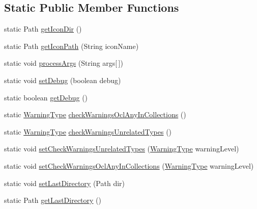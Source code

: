\subsection*{Static Public Member Functions}
\begin{DoxyCompactItemize}
\item 
static Path \hyperlink{classorg_1_1tzi_1_1use_1_1config_1_1_options_a686a663733d70cefe740299fad575731}{get\-Icon\-Dir} ()
\item 
static Path \hyperlink{classorg_1_1tzi_1_1use_1_1config_1_1_options_abd21f5e301e3168c381cd66e553f20c8}{get\-Icon\-Path} (String icon\-Name)
\item 
static void \hyperlink{classorg_1_1tzi_1_1use_1_1config_1_1_options_ab6bcad2f7ded933e8375c17c1926250f}{process\-Args} (String args\mbox{[}$\,$\mbox{]})
\item 
static void \hyperlink{classorg_1_1tzi_1_1use_1_1config_1_1_options_abdffb8b892ceaf0ad3cbe933b1216a78}{set\-Debug} (boolean debug)
\item 
static boolean \hyperlink{classorg_1_1tzi_1_1use_1_1config_1_1_options_af44b3d0bc782b604917bbaa04ccc9525}{get\-Debug} ()
\item 
static \hyperlink{enumorg_1_1tzi_1_1use_1_1config_1_1_options_1_1_warning_type}{Warning\-Type} \hyperlink{classorg_1_1tzi_1_1use_1_1config_1_1_options_aa2a9a9b563d0159ed5a90f1ac1cf56e3}{check\-Warnings\-Ocl\-Any\-In\-Collections} ()
\item 
static \hyperlink{enumorg_1_1tzi_1_1use_1_1config_1_1_options_1_1_warning_type}{Warning\-Type} \hyperlink{classorg_1_1tzi_1_1use_1_1config_1_1_options_a962fe96d6a6a66ddc6286ab47c043d6b}{check\-Warnings\-Unrelated\-Types} ()
\item 
static void \hyperlink{classorg_1_1tzi_1_1use_1_1config_1_1_options_aab797b5e72839e3cab51949bdc739ded}{set\-Check\-Warnings\-Unrelated\-Types} (\hyperlink{enumorg_1_1tzi_1_1use_1_1config_1_1_options_1_1_warning_type}{Warning\-Type} warning\-Level)
\item 
static void \hyperlink{classorg_1_1tzi_1_1use_1_1config_1_1_options_a9790ae3743265cad0a05ad9a0657eb21}{set\-Check\-Warnings\-Ocl\-Any\-In\-Collections} (\hyperlink{enumorg_1_1tzi_1_1use_1_1config_1_1_options_1_1_warning_type}{Warning\-Type} warning\-Level)
\item 
static void \hyperlink{classorg_1_1tzi_1_1use_1_1config_1_1_options_ad826ee59d298276407b799c3b97964aa}{set\-Last\-Directory} (Path dir)
\item 
static Path \hyperlink{classorg_1_1tzi_1_1use_1_1config_1_1_options_a1189060553b054dfa82923a1d91ea9e8}{get\-Last\-Directory} ()

\end{DoxyCompactItemize}
